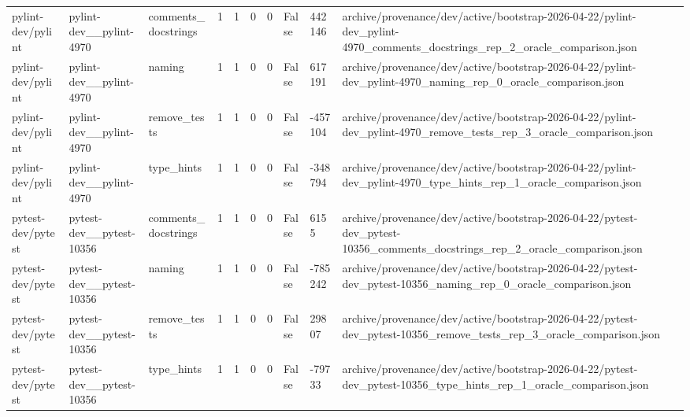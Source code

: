 \begin{tabular}{llllllllll}
pylint-dev/pylint & pylint-dev\_\_pylint-4970 & comments\_docstrings & 1 & 1 & 0 & 0 & False & 442146 & archive/provenance/dev/active/bootstrap-2026-04-22/pylint-dev\_pylint-4970\_comments\_docstrings\_rep\_2\_oracle\_comparison.json \\
pylint-dev/pylint & pylint-dev\_\_pylint-4970 & naming & 1 & 1 & 0 & 0 & False & 617191 & archive/provenance/dev/active/bootstrap-2026-04-22/pylint-dev\_pylint-4970\_naming\_rep\_0\_oracle\_comparison.json \\
pylint-dev/pylint & pylint-dev\_\_pylint-4970 & remove\_tests & 1 & 1 & 0 & 0 & False & -457104 & archive/provenance/dev/active/bootstrap-2026-04-22/pylint-dev\_pylint-4970\_remove\_tests\_rep\_3\_oracle\_comparison.json \\
pylint-dev/pylint & pylint-dev\_\_pylint-4970 & type\_hints & 1 & 1 & 0 & 0 & False & -348794 & archive/provenance/dev/active/bootstrap-2026-04-22/pylint-dev\_pylint-4970\_type\_hints\_rep\_1\_oracle\_comparison.json \\
pytest-dev/pytest & pytest-dev\_\_pytest-10356 & comments\_docstrings & 1 & 1 & 0 & 0 & False & 6155 & archive/provenance/dev/active/bootstrap-2026-04-22/pytest-dev\_pytest-10356\_comments\_docstrings\_rep\_2\_oracle\_comparison.json \\
pytest-dev/pytest & pytest-dev\_\_pytest-10356 & naming & 1 & 1 & 0 & 0 & False & -785242 & archive/provenance/dev/active/bootstrap-2026-04-22/pytest-dev\_pytest-10356\_naming\_rep\_0\_oracle\_comparison.json \\
pytest-dev/pytest & pytest-dev\_\_pytest-10356 & remove\_tests & 1 & 1 & 0 & 0 & False & 29807 & archive/provenance/dev/active/bootstrap-2026-04-22/pytest-dev\_pytest-10356\_remove\_tests\_rep\_3\_oracle\_comparison.json \\
pytest-dev/pytest & pytest-dev\_\_pytest-10356 & type\_hints & 1 & 1 & 0 & 0 & False & -79733 & archive/provenance/dev/active/bootstrap-2026-04-22/pytest-dev\_pytest-10356\_type\_hints\_rep\_1\_oracle\_comparison.json \\
\bottomrule
\end{tabular}
